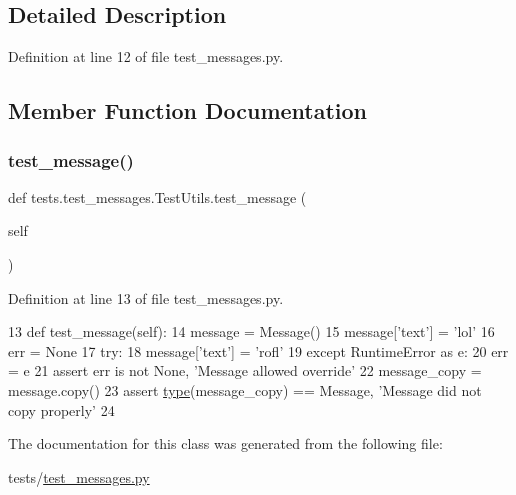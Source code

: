 \subsection{Detailed Description}


Definition at line 12 of file test\+\_\+messages.\+py.



\subsection{Member Function Documentation}
\mbox{\label{classtests_1_1test__messages_1_1TestUtils_ab43cf75c46098c2d2bd7ee061c93be96}} 
\subsubsection{\texorpdfstring{test\+\_\+message()}{test\_message()}}
{\footnotesize\ttfamily def tests.\+test\+\_\+messages.\+Test\+Utils.\+test\+\_\+message (\begin{DoxyParamCaption}\item[{}]{self }\end{DoxyParamCaption})}



Definition at line 13 of file test\+\_\+messages.\+py.


\begin{DoxyCode}
13     \textcolor{keyword}{def }test\_message(self):
14         message = Message()
15         message[\textcolor{stringliteral}{'text'}] = \textcolor{stringliteral}{'lol'}
16         err = \textcolor{keywordtype}{None}
17         \textcolor{keywordflow}{try}:
18             message[\textcolor{stringliteral}{'text'}] = \textcolor{stringliteral}{'rofl'}
19         \textcolor{keywordflow}{except} RuntimeError \textcolor{keyword}{as} e:
20             err = e
21         \textcolor{keyword}{assert} err \textcolor{keywordflow}{is} \textcolor{keywordflow}{not} \textcolor{keywordtype}{None}, \textcolor{stringliteral}{'Message allowed override'}
22         message\_copy = message.copy()
23         \textcolor{keyword}{assert} \hyperlink{namespaceparlai_1_1agents_1_1tfidf__retriever_1_1build__tfidf_ad5dfae268e23f506da084a9efb72f619}{type}(message\_copy) == Message, \textcolor{stringliteral}{'Message did not copy properly'}
24 \end{DoxyCode}


The documentation for this class was generated from the following file\+:\begin{DoxyCompactItemize}
\item 
tests/\hyperlink{test__messages_8py}{test\+\_\+messages.\+py}\end{DoxyCompactItemize}
